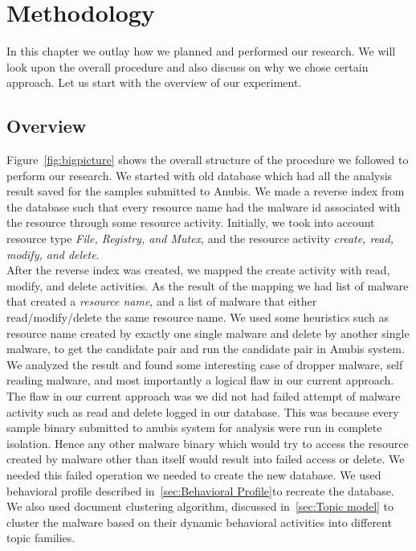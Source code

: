 \chapter{Methodology}\label{chapter:methodology}
In this chapter we outlay how we planned and performed our research.
We will look upon the overall procedure and also discuss on why we chose certain approach.
Let us start with the overview of our experiment.
\section{Overview}
\label{sec:Overview}
Figure~\ref{fig:bigpicture} shows the overall structure of the procedure we followed to perform our research.
We started with old database which had all the analysis result saved for the samples submitted to Anubis.
We made a reverse index from the database such that every resource name had the malware id associated with the resource through some resource activity.
Initially, we took into account resource type \emph{File, Registry, and Mutex}, and the resource activity \emph{create, read, modify, and delete}.\\
After the reverse index was created, we mapped the create activity with read, modify, and delete activities.
As the result of the mapping we had list of malware that created a \textit{resource name}, and a list of malware that either read/modify/delete the same resource name.
We used some heuristics such as resource name created by exactly one single malware and delete by another single malware, to get the candidate pair and run the candidate pair in Anubis system.
We analyzed the result and found some interesting case of dropper malware, self reading malware, and most importantly a logical flaw in our current approach.\\
The flaw in our current approach was we did not had failed attempt of malware activity such as read and delete logged in our database.
This was because every sample binary submitted to anubis system for analysis were run in complete isolation.
Hence any other malware binary which would try to access the resource created by malware other than itself would result into failed access or delete.
We needed this failed operation we needed to create the new database. We used behavioral profile described in~\ref{sec:Behavioral Profile}to recreate the database.\\
We also used document clustering algorithm, discussed in~\autoref{sec:Topic model} to cluster the malware based on their dynamic behavioral activities into different topic families.
